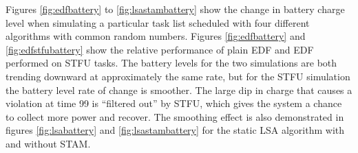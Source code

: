 Figures \ref{fig:edfbattery} to \ref{fig:lsastambattery} show the change in battery charge level when simulating a particular task list scheduled with four different algorithms with common random numbers.  Figures \ref{fig:edfbattery} and \ref{fig:edfstfubattery} show the relative performance of plain \textsc{EDF} and \textsc{EDF} performed on \textsc{STFU} tasks.  The battery levels for the two simulations are both trending downward at approximately the same rate, but for the \textsc{STFU} simulation the battery level rate of change is smoother.  The large dip in charge that causes a violation at time 99 is ``filtered out'' by \textsc{STFU}, which gives the system a chance to collect more power and recover.  The smoothing effect is also demonstrated in figures \ref{fig:lsabattery} and \ref{fig:lsastambattery} for the static \textsc{LSA} algorithm with and without \textsc{STAM}.































